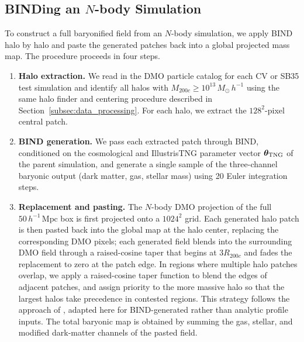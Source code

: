 \documentclass[linenumbers,trackchanges, twocolumn]{aastex701}
\begin{document}
\subsection{BINDing an $N$-body Simulation}
\label{subsec:binding}

To construct a full baryonified field from an $N$-body simulation, we apply \textsc{BIND} halo by halo and paste the generated patches back into a global projected mass map. The procedure proceeds in four steps.

\begin{enumerate}
    \item \textbf{Halo extraction.} We read in the DMO particle catalog for each CV or SB35 test simulation and identify all halos with $M_{200c} \geq 10^{13}\,M_\odot\,h^{-1}$ using the same halo finder and centering procedure described in Section~\ref{subsec:data_processing}. For each halo, we extract the $128^2$-pixel central patch.

    \item \textbf{BIND generation.} We pass each extracted patch through \textsc{BIND}, conditioned on the cosmological and IllustrisTNG parameter vector $\boldsymbol{\theta}_{\rm TNG}$ of the parent simulation, and generate a single sample of the three-channel baryonic output (dark matter, gas, stellar mass) using 20 Euler integration steps.

    \item \textbf{Replacement and pasting.} The $N$-body DMO projection of the full $50\,h^{-1}\,\mathrm{Mpc}$ box is first projected onto a $1024^2$ grid. Each generated halo patch is then pasted back into the global map at the halo center, replacing the corresponding DMO pixels; each generated field blends into the surrounding DMO field through a raised-cosine taper that begins at $3R_{200c}$ and fades the replacement to zero at the patch edge.
In regions where multiple halo patches overlap, we apply a raised-cosine taper function to blend the edges of adjacent patches, and assign priority to the more massive halo so that the largest halos take precedence in contested regions. This strategy follows the approach of \citet{Lee-2023}, adapted here for \textsc{BIND}-generated rather than analytic profile inputs. The total baryonic map is obtained by summing the gas, stellar, and modified dark-matter channels of the pasted field.


\end{enumerate}
\end{document}
